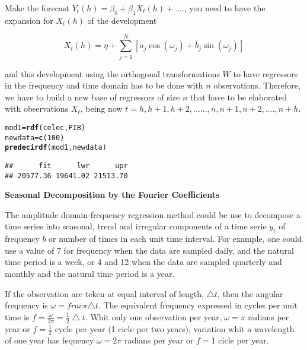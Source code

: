 \documentclass{article}\usepackage[]{graphicx}\usepackage[]{color}
\makeatletter
\newcommand{\hlnum}[1]{\textcolor[rgb]{0.686,0.059,0.569}{#1}}%
\newcommand{\hlstd}[1]{\textcolor[rgb]{0.345,0.345,0.345}{#1}}%
\newcommand{\hlkwb}[1]{\textcolor[rgb]{0.69,0.353,0.396}{#1}}%
\newcommand{\hlkwd}[1]{\textcolor[rgb]{0.737,0.353,0.396}{\textbf{#1}}}%
\newenvironment{kframe}{%
 \def\at@end@of@kframe{}%
 \ifinner\ifhmode%
  \def\at@end@of@kframe{\end{minipage}}%
  \begin{minipage}{\columnwidth}%
 \fi\fi%
 \def\FrameCommand##1{\hskip\@totalleftmargin \hskip-\fboxsep
 \colorbox{shadecolor}{##1}\hskip-\fboxsep
     \hskip-\linewidth \hskip-\@totalleftmargin \hskip\columnwidth}%
 \MakeFramed {\advance\hsize-\width
   \@totalleftmargin\z@ \linewidth\hsize
   \@setminipage}}%
 {\par\unskip\endMakeFramed%
 \at@end@of@kframe}
\newenvironment{knitrout}{}{} %
\makeatother
\begin{document}
\begin{knitrout}
\end{knitrout}

Make the forecast  $Y_t(h)=\beta_0+\beta_1X_t(h)+....$, you need to have the expansion for $X_t(h)$ of the development 

\begin{equation}
    X_t(h)=\eta+\sum_{j=1}^N[a_j\cos(\omega_j)+b_j\sin(\omega_j)]
    \end{equation}

and this development using the orthogonal transformations $W$ to have regressors in the frequency and time domain has to be done with $n$ observations. Therefore, we have to build a new base of regressors of size $n$ that have to be elaborated with observations $X_t$, being now $t=h,h+1,h+2, ...... ,n,n+1,n+2, ....,n+h$.

\begin{knitrout}
\color{fgcolor}\begin{kframe}
\begin{alltt}
\hlstd{mod1}\hlkwb{=}\hlkwd{rdf}\hlstd{(celec,PIB)}
\hlstd{newdata}\hlkwb{=}\hlkwd{c}\hlstd{(}\hlnum{100}\hlstd{)}
\hlkwd{predecirdf}\hlstd{(mod1,newdata)}
\end{alltt}
\begin{verbatim}
##      fit      lwr      upr 
## 20577.36 19641.02 21513.70
\end{verbatim}
\end{kframe}
\end{knitrout}

 {\bf Seasonal Decomposition by the Fourier Coefficients}

The amplitude domain-frequency regression  method could be use to decompose a time series into seasonal, trend and irregular components of a time serie $y_t$ of frequency $b$ or number of times in each unit time interval. For example, one could use a value of 7 for frequency when the data are sampled daily, and the natural time period is a week, or 4 and 12 when the data are sampled quarterly and monthly and the natural time period is a year.

If the observation are teken at equal interval of length, $\bigtriangleup t$, then the angular frequency is $\omega=frac{\pi}{\bigtriangleup t}$. The equivalent frequency expressed in cycles per unit time is $f=\frac{\omega}{2\pi}=\frac{1}{2} \bigtriangleup t$. Whit only one observation per year, $\omega=\pi$ radians per year or $f=\frac{1}{2}$ cycle per year (1 cicle per two years), variation whit a wavelength of one year has fequency $\omega=2\pi$ radians per year or $f=1$ cicle per year.
\end{document}
